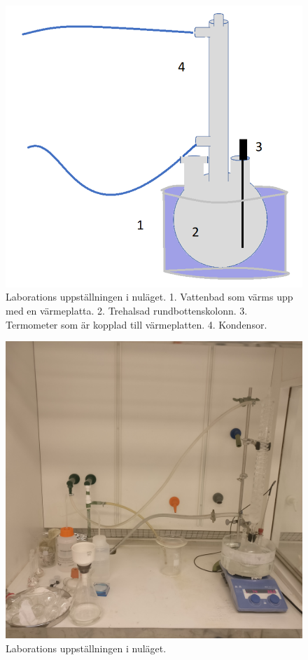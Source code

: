\newpage
\thispagestyle{empty}
\begin{figure}[H]
    \centering
    \includegraphics[scale=0.6]{labbupp.png}
    \caption{Laborations uppställningen i nuläget. 1. Vattenbad som värms upp med en värmeplatta. 2. Trehalsad rundbottenskolonn. 3. Termometer som är kopplad till värmeplatten. 4. Kondensor.    }
    \label{fig:lab}
\end{figure}

\newpage
\thispagestyle{empty}
\begin{figure}[H]
    \centering
    \includegraphics[scale=0.1]{labsetup.jpg}
    \caption{Laborations uppställningen i nuläget.}
    \label{fig:labpaint}
\end{figure}






